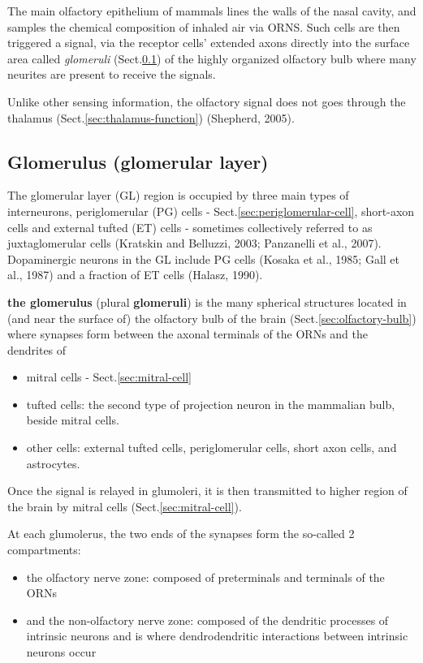 The main olfactory epithelium of mammals lines the walls of the nasal cavity,
and samples the chemical composition of inhaled air via ORNS.
Such cells are then triggered a signal, via the receptor cells' extended axons
directly into the surface area called {\it glomeruli}
(Sect.\ref{sec:glomerulus}) of the highly organized olfactory bulb where many
neurites are present to receive the signals.

Unlike other sensing information, the olfactory signal does not goes through the
thalamus (Sect.\ref{sec:thalamus-function}) (Shepherd, 2005).

\subsection{Glomerulus (glomerular layer)}
\label{sec:glomerulus}

The glomerular layer (GL) region is occupied by three main types of
interneurons, periglomerular (PG) cells - Sect.\ref{sec:periglomerular-cell},
short-axon cells and external tufted (ET) cells - sometimes collectively
referred to as juxtaglomerular cells (Kratskin and Belluzzi, 2003; Panzanelli et
al., 2007). Dopaminergic neurons in the GL include PG cells (Kosaka et al.,
1985; Gall et al., 1987) and a fraction of ET cells (Halasz, 1990).

{\bf the glomerulus} (plural {\bf glomeruli}) is the many spherical structures
located in (and near the surface of) the olfactory bulb of the brain
(Sect.\ref{sec:olfactory-bulb}) where synapses form between the axonal terminals
of the ORNs and the dendrites of
\begin{itemize}
  \item mitral cells - Sect.\ref{sec:mitral-cell}
  
  \item tufted cells: the second type of projection neuron in the mammalian
  bulb, beside mitral cells.

  \item other cells:  external tufted cells, periglomerular cells,
  short axon cells, and astrocytes.
  
\end{itemize}
Once the signal is relayed in glumoleri, it is then transmitted to higher region
of the brain by mitral cells (Sect.\ref{sec:mitral-cell}).

At each glumolerus, the two ends of the synapses form the so-called 2
compartments: 
\begin{itemize}
  \item  the olfactory nerve zone: composed of preterminals and terminals of
  the ORNs
  
  \item and the non-olfactory nerve zone: composed of the dendritic processes of
  intrinsic neurons and is where dendrodendritic interactions between
  intrinsic neurons occur
\end{itemize}

